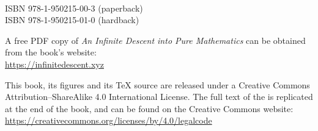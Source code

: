 {\small
~

\vfill

\thispagestyle{empty}


ISBN 978-1-950215-00-3 (paperback)\\
ISBN 978-1-950215-01-0 (hardback)

\begin{minipage}{0.75\textwidth}
\small
A free PDF copy of \textit{An Infinite Descent into Pure Mathematics} can be obtained from the book's website:\\
\url{https://infinitedescent.xyz}
\end{minipage}

\begin{minipage}{0.75\textwidth}
\small
This book, its figures and its \TeX{} source are released under a Creative Commons Attribution--ShareAlike 4.0 International License. The full text of the  is replicated at the end of the book, and can be found on the Creative Commons website:\\
\url{https://creativecommons.org/licenses/by/4.0/legalcode}
\end{minipage}

}
